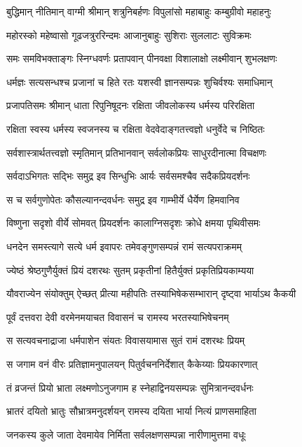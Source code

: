 \twolineshloka
{बुद्धिमान् नीतिमान् वाग्मी श्रीमान् शत्रुनिबर्हणः}
{विपुलांसो महाबाहुः कम्बुग्रीवो महाहनुः}%

\twolineshloka
{महोरस्को महेष्वासो गूढजत्रुररिन्दमः}
{आजानुबाहुः सुशिराः सुललाटः सुविक्रमः}%

\twolineshloka
{समः समविभक्ताङ्गः स्निग्धवर्णः प्रतापवान्}
{पीनवक्षा विशालाक्षो लक्ष्मीवान् शुभलक्षणः}%

\twolineshloka
{धर्मज्ञः सत्यसन्धश्च प्रजानां च हिते रतः}
{यशस्वी ज्ञानसम्पन्नः शुचिर्वश्यः समाधिमान्}%

\twolineshloka
{प्रजापतिसमः श्रीमान् धाता रिपुनिषूदनः}
{रक्षिता जीवलोकस्य धर्मस्य परिरक्षिता}%

\twolineshloka
{रक्षिता स्वस्य धर्मस्य स्वजनस्य च रक्षिता}
{वेदवेदाङ्गतत्त्वज्ञो धनुर्वेदे च निष्ठितः}%

\twolineshloka
{सर्वशास्त्रार्थतत्त्वज्ञो स्मृतिमान् प्रतिभानवान्}
{सर्वलोकप्रियः साधुरदीनात्मा विचक्षणः}%

\twolineshloka
{सर्वदाऽभिगतः सद्भिः समुद्र इव सिन्धुभिः}
{आर्यः सर्वसमश्चैव सदैकप्रियदर्शनः}%

\twolineshloka
{स च सर्वगुणोपेतः कौसल्यानन्दवर्धनः}
{समुद्र इव गाम्भीर्ये धैर्येण हिमवानिव}%

\twolineshloka
{विष्णुना सदृशो वीर्ये सोमवत् प्रियदर्शनः}
{कालाग्निसदृशः क्रोधे क्षमया पृथिवीसमः}%

\twolineshloka
{धनदेन समस्त्यागे सत्ये धर्म इवापरः}
{तमेवङ्गुणसम्पन्नं रामं सत्यपराक्रमम्}%

\twolineshloka
{ज्येष्ठं श्रेष्ठगुणैर्युक्तं प्रियं दशरथः सुतम्}
{प्रकृतीनां हितैर्युक्तं प्रकृतिप्रियकाम्यया}%

\twolineshloka
{यौवराज्येन संयोक्तुम् ऐच्छत् प्रीत्या महीपतिः}
{तस्याभिषेकसम्भारान् दृष्ट्वा भार्याऽथ कैकयी}%

\twolineshloka
{पूर्वं दत्तवरा देवी वरमेनमयाचत}
{विवासनं च रामस्य भरतस्याभिषेचनम्}%

\twolineshloka
{स सत्यवचनाद्राजा धर्मपाशेन संयतः}
{विवासयामास सुतं रामं दशरथः प्रियम्}%

\twolineshloka
{स जगाम वनं वीरः प्रतिज्ञामनुपालयन्}
{पितुर्वचननिर्देशात् कैकेय्याः प्रियकारणात्}%

\twolineshloka
{तं व्रजन्तं प्रियो भ्राता लक्ष्मणोऽनुजगाम ह}
{स्नेहाद्विनयसम्पन्नः सुमित्रानन्दवर्धनः}%

\twolineshloka
{भ्रातरं दयितो भ्रातुः सौभ्रात्रमनुदर्शयन्}
{रामस्य दयिता भार्या नित्यं प्राणसमाहिता}%

\twolineshloka
{जनकस्य कुले जाता देवमायेव निर्मिता}
{सर्वलक्षणसम्पन्ना नारीणामुत्तमा वधूः}%

